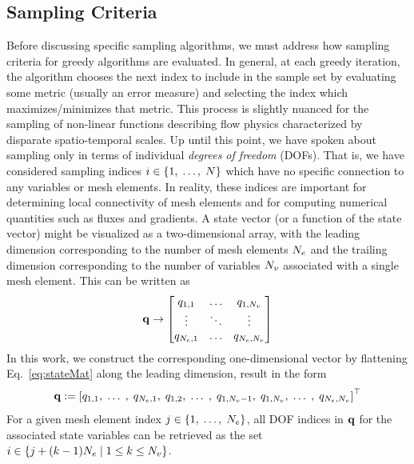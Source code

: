 \subsection{Sampling Criteria}
%
Before discussing specific sampling algorithms, we must address how sampling criteria for greedy algorithms are evaluated. In general, at each greedy iteration, the algorithm chooses the next index to include in the sample set by evaluating some metric (usually an error measure) and selecting the index which maximizes/minimizes that metric. This process is slightly nuanced for the sampling of non-linear functions describing flow physics characterized by disparate spatio-temporal scales. Up until this point, we have spoken about sampling only in terms of individual \textit{degrees of freedom} (DOFs). That is, we have considered sampling indices $i \in \{1,\; \hdots, \; N\}$ which have no specific connection to any variables or mesh elements. In reality, these indices are important for determining local connectivity of mesh elements and for computing numerical quantities such as fluxes and gradients. A state vector (or a function of the state vector) might be visualized as a two-dimensional array, with the leading dimension corresponding to the number of mesh elements $N_{e}$ and the trailing dimension corresponding to the number of variables $N_{v}$ associated with a single mesh element. This can be written as
%
\begin{equation}\label{eq:stateMat}
	\mathbf{q} \rightarrow
	\begin{bmatrix}
		q_{1,1} & \hdots & q_{1,N_{v}} \\
		\vdots & \ddots & \vdots \\
		q_{N_{e},1} & \hdots & q_{N_{e},N_{v}}
	\end{bmatrix}
\end{equation}
%
In this work, we construct the corresponding one-dimensional vector by flattening Eq.~\ref{eq:stateMat} along the leading dimension, result in the form
%
\begin{equation}
	\mathbf{q} := \left[q_{1,1}, \; \hdots \;, \; q_{N_{e},1}, \; q_{1,2}, \; \hdots \;, \; q_{1,N_{v}-1}, \; q_{1,N_{v}}, \; \hdots \;, \; q_{N_{e},N_{v}} \right]^\top
\end{equation}
%
For a given mesh element index $j \in \{1,\; \hdots,\; N_{e}\}$, all DOF indices in $\mathbf{q}$ for the associated state variables can be retrieved as the set $i \in \{j + (k-1) N_{e} \; \vert \; 1 \le k \le N_{v} \}$.

